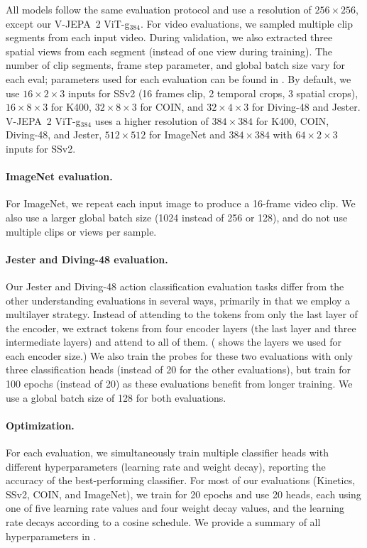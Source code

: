 \documentclass[]{fairmeta}
\newcommand{\model}{V-JEPA~2\xspace}
\begin{document}
All models follow the same evaluation protocol and use a resolution of $256\times256$, except our \model ViT-g$_{384}$. For video evaluations, we sampled multiple clip segments from each input video. During validation, we also extracted three spatial views from each segment (instead of one view during training). The number of clip segments, frame step parameter, and global batch size vary for each eval; parameters used for each evaluation can be found in . By default, we use $16\times2\times3$ inputs for SSv2 (16 frames clip, 2 temporal crops, 3 spatial crops), $16\times8\times3$ for K400, $32\times8\times3$ for COIN, and $32\times4\times3$ for Diving-48 and Jester. \model ViT-g$_{384}$ uses a higher resolution of $384\times384$ for K400, COIN, Diving-48, and Jester, $512\times512$ for ImageNet and $384\times384$ with $64\times2\times3$ inputs for SSv2.

\paragraph{\bf ImageNet evaluation.} For ImageNet, we repeat each input image to produce a 16-frame video clip. We also use a larger global batch size (1024 instead of 256 or 128), and do not use multiple clips or views per sample.

\paragraph{\bf Jester and Diving-48 evaluation.} Our Jester and Diving-48 action classification evaluation tasks differ from the other understanding evaluations in several ways, primarily in that we employ a multilayer strategy. Instead of attending to the tokens from only the last layer of the encoder, we extract tokens from four encoder layers (the last layer and three intermediate layers) and attend to all of them. ( shows the layers we used for each encoder size.) We also train the probes for these two evaluations with only three classification heads (instead of 20 for the other evaluations), but train for 100 epochs (instead of 20) as these evaluations benefit from longer training. We use a global batch size of 128 for both evaluations.

\paragraph{\bf Optimization.} For each evaluation, we simultaneously train multiple classifier heads with different hyperparameters (learning rate and weight decay), reporting the accuracy of the best-performing classifier. For most of our evaluations (Kinetics, SSv2, COIN, and ImageNet), we train for 20 epochs and use 20 heads, each using one of five learning rate values and four weight decay values, and the learning rate decays according to a cosine schedule. We provide a summary of all hyperparameters in .
\end{document}

